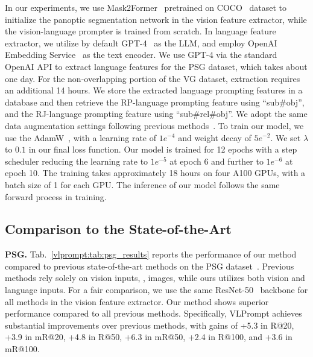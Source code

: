 In our experiments, we use Mask2Former~\citep{cheng2022masked} pretrained on COCO~\citep{lin2014microsoft} dataset to initialize the panoptic segmentation network in the vision feature extractor, while the vision-language prompter is trained from scratch.
In language feature extractor, we utilize by default GPT-4~\citep{chatgpt} as the LLM, and employ OpenAI Embedding Service~\citep{chatgpt} as the text encoder.
We use GPT-4 via the standard OpenAI API to extract language features for the PSG dataset, which takes about one day.
For the non-overlapping portion of the VG dataset, extraction requires an additional 14 hours.
We store the extracted language prompting features in a database and then retrieve the RP-language prompting feature using ``sub\#obj'', and the RJ-language prompting feature using ``sub\#rel\#obj''.
We adopt the same data augmentation settings following previous methods~\citep{yang2022panoptic, zhou2023hilo}.
To train our model, we use the AdamW~\citep{loshchilov2017decoupled}, with a learning rate of $1e^{-4}$ and weight decay of $5e^{-2}$.
We set $\lambda$ to $0.1$ in our final loss function.
Our model is trained for 12 epochs with a step scheduler reducing the learning rate to $1e^{-5}$ at epoch 6 and further to $1e^{-6}$ at epoch 10.
The training takes approximately 18 hours on four A100 GPUs, with a batch size of 1 for each GPU.
The inference of our model follows the same forward process in training.


\subsection{Comparison to the State-of-the-Art}
\noindent \textbf{PSG.}
Tab.~\ref{vlprompt:tab:psg_results} reports the performance of our method compared to previous state-of-the-art methods on the PSG dataset~\citep{yang2022panoptic}.
Previous methods rely solely on vision inputs, \ie, images, while ours utilizes both vision and language inputs.
For a fair comparison, we use the same ResNet-50~\citep{he2016deep} backbone for all methods in the vision feature extractor.
Our method shows superior performance compared to all previous methods.
Specifically, VLPrompt achieves substantial improvements over previous methods, with gains of +5.3 in R@20, +3.9 in mR@20, +4.8 in R@50, +6.3 in mR@50, +2.4 in R@100, and +3.6 in mR@100.

